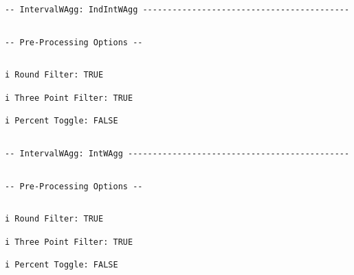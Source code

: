 \documentclass[article]{jss}
\begin{document}
\begin{verbatim}
-- IntervalWAgg: IndIntWAgg ------------------------------------------
\end{verbatim}

\begin{verbatim}
\end{verbatim}

\begin{verbatim}
-- Pre-Processing Options --
\end{verbatim}

\begin{verbatim}
\end{verbatim}

\begin{verbatim}
i Round Filter: TRUE
\end{verbatim}

\begin{verbatim}
i Three Point Filter: TRUE
\end{verbatim}

\begin{verbatim}
i Percent Toggle: FALSE
\end{verbatim}

\begin{verbatim}
\end{verbatim}

\begin{verbatim}
-- IntervalWAgg: IntWAgg ---------------------------------------------
\end{verbatim}

\begin{verbatim}
\end{verbatim}

\begin{verbatim}
-- Pre-Processing Options --
\end{verbatim}

\begin{verbatim}
\end{verbatim}

\begin{verbatim}
i Round Filter: TRUE
\end{verbatim}

\begin{verbatim}
i Three Point Filter: TRUE
\end{verbatim}

\begin{verbatim}
i Percent Toggle: FALSE
\end{verbatim}
\end{document}
